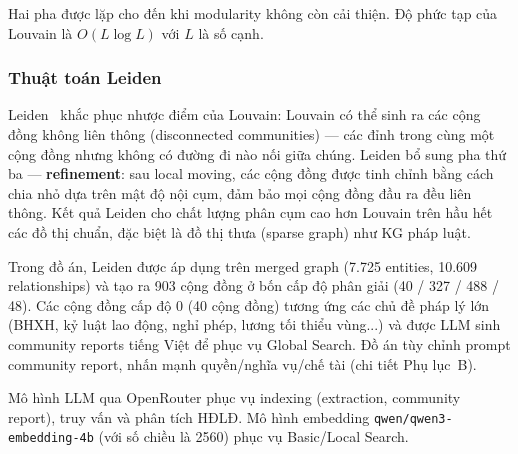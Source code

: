 \documentclass[../DoAn.tex]{subfiles}
\begin{document}
Hai pha được lặp cho đến khi modularity không còn cải thiện. Độ phức tạp của Louvain là $O(L \log L)$ với $L$ là số cạnh.

\subsubsection*{Thuật toán Leiden}

Leiden~\cite{traag2019leiden} khắc phục nhược điểm của Louvain: Louvain có thể sinh ra các cộng đồng không liên thông (disconnected communities) --- các đỉnh trong cùng một cộng đồng nhưng không có đường đi nào nối giữa chúng. Leiden bổ sung pha thứ ba --- \textbf{refinement}: sau local moving, các cộng đồng được tinh chỉnh bằng cách chia nhỏ dựa trên mật độ nội cụm, đảm bảo mọi cộng đồng đầu ra đều liên thông. Kết quả Leiden cho chất lượng phân cụm cao hơn Louvain trên hầu hết các đồ thị chuẩn, đặc biệt là đồ thị thưa (sparse graph) như KG pháp luật.

Trong đồ án, Leiden được áp dụng trên merged graph (7.725 entities, 10.609 relationships) và tạo ra 903 cộng đồng ở bốn cấp độ phân giải (40 / 327 / 488 / 48). Các cộng đồng cấp độ 0 (40 cộng đồng) tương ứng các chủ đề pháp lý lớn (BHXH, kỷ luật lao động, nghỉ phép, lương tối thiểu vùng...) và được LLM sinh community reports tiếng Việt để phục vụ Global Search. Đồ án tùy chỉnh prompt community report, nhấn mạnh quyền/nghĩa vụ/chế tài (chi tiết Phụ lục~B).

Mô hình \gls{LLM} qua OpenRouter phục vụ indexing (extraction, community report), truy vấn và phân tích HĐLĐ. Mô hình embedding \texttt{qwen/qwen3-embedding-4b} (với số chiều là 2560) phục vụ Basic/Local Search.
\end{document}
